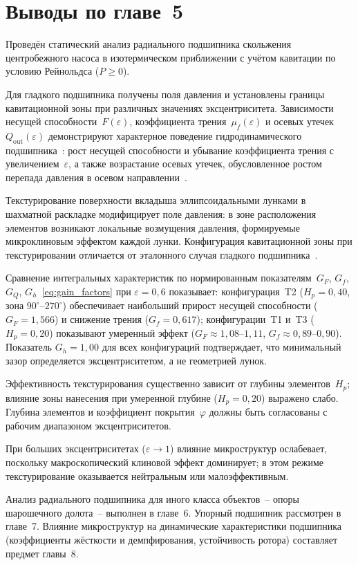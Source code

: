 \FloatBarrier
\section*{Выводы по главе~5}

Проведён статический анализ радиального подшипника скольжения
центробежного насоса в изотермическом приближении с учётом
кавитации по условию Рейнольдса ($P \geq 0$).

Для гладкого подшипника получены поля давления и установлены
границы кавитационной зоны при различных значениях
эксцентриситета. Зависимости несущей
способности~$F(\varepsilon)$, коэффициента
трения~$\mu_f(\varepsilon)$ и осевых
утечек~$Q_{\mathrm{out}}(\varepsilon)$ демонстрируют
характерное поведение гидродинамического подшипника~\cite{rakhonde2018,manshoor2013,madhusudhanarao2020}: рост
несущей способности и убывание коэффициента трения
с увеличением~$\varepsilon$, а также возрастание осевых утечек,
обусловленное ростом перепада давления в осевом направлении~\cite{christiansen2017,zhang2015,fernandes2012}.

Текстурирование поверхности вкладыша эллипсоидальными лунками
в шахматной раскладке модифицирует поле давления: в зоне
расположения элементов возникают локальные возмущения давления,
формируемые микроклиновым эффектом каждой лунки. Конфигурация
кавитационной зоны при текстурировании отличается от эталонного
случая гладкого подшипника~\cite{shenoy2010,elsaid2017}.

Сравнение интегральных характеристик по нормированным
показателям~$G_F$, $G_f$, $G_Q$, $G_h$~\eqref{eq:gain_factors}
при $\varepsilon = 0{,}6$ показывает: конфигурация~T2
($H_p = 0{,}40$, зона $90^{\circ}$--$270^{\circ}$) обеспечивает
наибольший прирост несущей способности ($G_F = 1{,}566$)
и снижение трения ($G_f = 0{,}617$); конфигурации~T1
и~T3 ($H_p = 0{,}20$) показывают умеренный эффект
($G_F \approx 1{,}08$--$1{,}11$, $G_f \approx 0{,}89$--$0{,}90$).
Показатель $G_h = 1{,}00$ для всех конфигураций подтверждает,
что минимальный зазор определяется эксцентриситетом, а не
геометрией лунок.

Эффективность текстурирования существенно зависит от глубины
элементов~$H_p$; влияние зоны нанесения при умеренной глубине
($H_p = 0{,}20$) выражено слабо. Глубина элементов
и коэффициент покрытия~$\varphi$ должны быть согласованы
с рабочим диапазоном эксцентриситетов.

При больших эксцентриситетах ($\varepsilon \to 1$) влияние
микроструктур ослабевает, поскольку макроскопический клиновой
эффект доминирует; в этом режиме текстурирование оказывается
нейтральным или малоэффективным.

Анализ радиального подшипника для иного класса объектов~--
опоры шарошечного долота~-- выполнен в главе~6. Упорный
подшипник рассмотрен в главе~7. Влияние микроструктур
на динамические характеристики подшипника (коэффициенты
жёсткости и демпфирования, устойчивость ротора) составляет
предмет главы~8.

